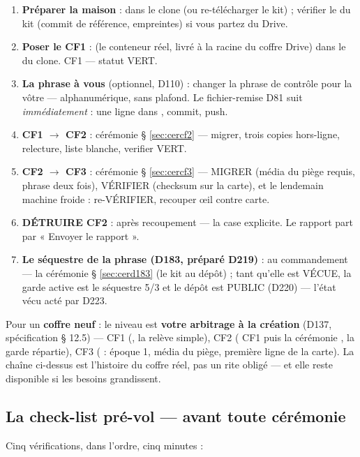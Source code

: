 \begin{enumerate}
\item \textbf{Préparer la maison} :  dans le clone (ou re-télécharger
le kit) ; vérifier le  du kit (commit de référence, empreintes)
si vous partez du Drive.
\item \textbf{Poser le CF1} :  (le conteneur réel, livré à la
racine du coffre Drive) dans le  du clone. CF1 — statut
VERT.
\item \textbf{La phrase à vous} (optionnel, D110) : changer la phrase de contrôle
pour la vôtre — alphanumérique, sans plafond. Le fichier-remise D81 suit
\emph{immédiatement} : une ligne dans , commit, push.
\item \textbf{CF1 $\to$ CF2} : cérémonie § \ref{sec:cercf2} — migrer, trois copies
hors-ligne, relecture, liste blanche, verifier VERT.
\item \textbf{CF2 $\to$ CF3} : cérémonie § \ref{sec:cercf3} — MIGRER (média du piège
requis, phrase deux fois), VÉRIFIER (checksum sur la carte), et le lendemain machine
froide : re-VÉRIFIER, recouper œil contre carte.
\item \textbf{DÉTRUIRE CF2} : après recoupement — la case explicite. Le rapport
part par « Envoyer le rapport ».
\item \textbf{Le séquestre de la phrase (D183, préparé D219)} : au
commandement — la cérémonie § \ref{sec:cerd183} (le kit au dépôt) ; tant
qu'elle est VÉCUE, la garde active est le séquestre 5/3 et le dépôt est
PUBLIC (D220) — l'état vécu acté par D223.
\end{enumerate}

Pour un \textbf{coffre neuf} : le niveau est \textbf{votre arbitrage à la création}
(D137, spécification § 12.5) — CF1 (, la relève simple),
CF2 ( CF1 puis la cérémonie , la garde
répartie), CF3 ( : époque 1, média du piège, première
ligne de la carte). La chaîne ci-dessus est l'histoire du coffre réel, pas un rite
obligé — et elle reste disponible si les besoins grandissent.

\subsection{La check-list pré-vol — avant toute cérémonie}\label{sec:preflight}

Cinq vérifications, dans l'ordre, cinq minutes :

